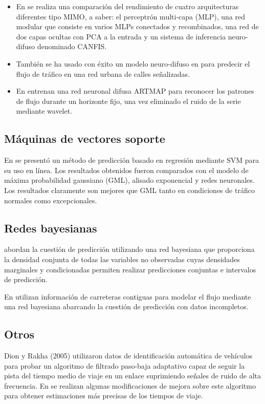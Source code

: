 \documentclass{llncs}
\begin{document}
\begin{itemize}
\item En \cite{Ishak2004452} se realiza una comparación del rendimiento de cuatro arquitecturas diferentes tipo MIMO, a saber: el perceptrón multi-capa (MLP), una red modular que consiste en varios MLPs conectados y recombinados, una red de dos capas ocultas con PCA a la entrada y un sistema de inferencia neuro-difuso denominado CANFIS. 
\item También se ha usado con éxito un modelo neuro-difuso en \cite{yin2002urban} para predecir el flujo de tráfico en una red urbana de calles señalizadas.
\item En \cite{boto2010wavelet}  entrenan una red neuronal difusa ARTMAP para reconocer los patrones de flujo durante un horizonte fijo, una vez eliminado el ruido de la serie mediante wavelet.
\end{itemize}

\subsection{Máquinas de vectores soporte}

En \cite{castro2009online} se presentó un método de predicción basado en regresión mediante SVM para su uso en línea. Los resultados obtenidos fueron comparados con el modelo de máxima probabilidad gaussiano (GML), alisado exponencial y redes neuronales. Los resultados claramente son mejores que GML tanto en condiciones de tráfico normales como excepcionales.


\subsection{Redes bayesianas}
\cite{castillo2008predicting} abordan la cuestión de predicción utilizando una red bayesiana que proporciona la densidad conjunta de todas las variables no observadas cuyas densidades marginales y condicionadas permiten realizar predicciones conjuntas e intervalos de predicción.

En \cite{sun2006bayesian} utilizan información de carreteras contiguas para modelar el flujo mediante una red bayesiana abarcando la cuestión de predicción con datos incompletos.


\subsection{Otros}

Dion y Rakha (2005) \cite{dion2006estimating} utilizaron datos de identificación automática de vehículos para probar un algoritmo de filtrado paso-baja adaptativo capaz de seguir la pista del tiempo medio de viaje en un enlace suprimiendo señales de ruido de alta frecuencia.
En \cite{tam2008using} se realizan algunas modificaciones de mejora sobre este algoritmo para obtener estimaciones más precisas de los tiempos de viaje.
\end{document}
